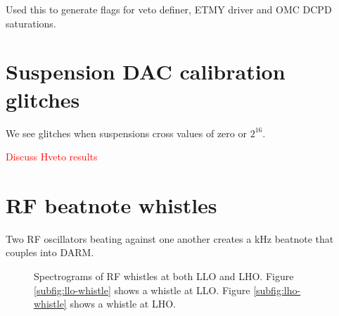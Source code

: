 Used this to generate flags for veto definer, ETMY driver and OMC DCPD saturations.

\section{Suspension DAC calibration glitches}

We see glitches when suspensions cross values of zero or $2^{16}$.

\textcolor{red}{Discuss Hveto results}

\section{RF beatnote whistles}

Two RF oscillators beating against one another creates a kHz beatnote that couples 
into DARM.

\begin{figure}[ht!]%
\centering
{}
  
\caption[Spectrograms of RF whistles]{Spectrograms of RF whistles at %
         both LLO and LHO. Figure \ref{subfig:llo-whistle} shows a %
         whistle at LLO. Figure \ref{subfig:lho-whistle} shows a whistle %
         at LHO.
         }
\end{figure}\label{fig:whistle-spectrograms}

